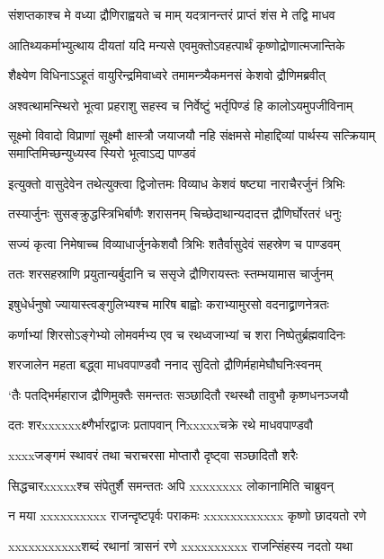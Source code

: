 \twolineshloka
{संशप्तकाश्च मे वध्या द्रौणिराह्वयते च माम्}
{यदत्रानन्तरं प्राप्तं शंस मे तद्वि माधव}


\twolineshloka
{आतिथ्यकर्माभ्युत्थाय दीयतां यदि मन्यसे}
{एवमुक्तोऽवहत्पार्थं कृष्णोद्रोणात्मजान्तिके}


\twolineshloka
{शैक्ष्येण विधिनाऽऽहूतं वायुरिन्द्रमिवाध्वरे}
{तमामन्त्र्यैकमनसं केशवो द्रौणिमब्रवीत्}


\twolineshloka
{अश्वत्थामन्स्थिरो भूत्वा प्रहराशु सहस्व च}
{निर्वेष्टुं भर्तृपिण्डं हि कालोऽयमुपजीविनाम्}


सूक्ष्मो विवादो विप्राणां सूक्ष्मौ क्षास्त्रौ जयाजयौ
\twolineshloka
{नहि संक्षमसे मोहाद्दिव्यां पार्थस्य सत्क्रियाम्}
{समाप्तिमिच्छन्युध्यस्व स्यिरो भूत्वाऽद्य पाण्डवं}


\twolineshloka
{इत्युक्तो वासुदेवेन तथेत्युक्त्वा द्विजोत्तमः}
{विव्याध केशवं षष्ट्या नाराचैरर्जुनं त्रिभिः}


\twolineshloka
{तस्यार्जुनः सुसङ्क्रुद्धस्त्रिभिर्बाणैः शरासनम्}
{चिच्छेदाथान्यदादत्त द्रौणिर्घोरतरं धनुः}


\twolineshloka
{सज्यं कृत्वा निमेषाच्च विव्याधार्जुनकेशवौ}
{त्रिभिः शतैर्वासुदेवं सहस्रेण च पाण्डवम्}


\twolineshloka
{ततः शरसहस्राणि प्रयुतान्यर्बुदानि च}
{ससृजे द्रौणिरायस्तः स्तम्भयामास चार्जुनम्}


\twolineshloka
{इषुधेर्धनुषो ज्यायास्त्वङ्गुलिभ्यश्च मारिष}
{बाह्वोः कराभ्यामुरसो वदनाद्व्राणनेत्रतः}


\twolineshloka
{कर्णाभ्यां शिरसोऽङ्गेभ्यो लोमवर्मभ्य एव च}
{रथध्वजाभ्यां च शरा निष्पेतुर्ब्रह्मवादिनः}


\twolineshloka
{शरजालेन महता बद्ध्वा माधवपाण्डवौ}
{ननाद सुदितो द्रौणिर्महामेघौघनिःस्वनम्}


\twolineshloka
{`तैः पतद्भिर्महाराज द्रौणिमुक्तैः समन्ततः}
{सञ्छादितौ रथस्थौ तावुभौ कृष्णधनञ्जयौ}


\twolineshloka
{दतः शरxxxxxxक्ष्णैर्भारद्वाजः प्रतापवान्}
{निxxxxxचक्रे रथे माधवपाण्डवौ}


\twolineshloka
{xxxxजङ्गमं स्थावरं तथा}
{चराचरसा मोप्तारौ दृष्ट्वा सञ्छादितौ शरैः}


\twolineshloka
{सिद्धचारxxxxxश्च संपेतुर्शै समन्ततः}
{अपि xxxxxxxx लोकानामिति चाब्रुवन्}


\twolineshloka
{न मया xxxxxxxxxx राजन्दृष्टपृर्वः पराकमः}
{xxxxxxxxxxxx कृष्णो छादयतो रणे}


\twolineshloka
{xxxxxxxxxxxशब्दं रथानां त्रासनं रणे}
{xxxxxxxxxx राजन्सिंहस्य नदतो यथा}


